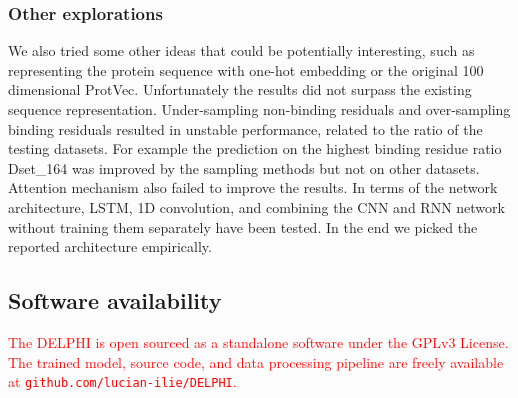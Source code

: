 \documentclass{bioinfo}
\newcommand{\mySecondColor}{red}
\begin{document}
\subsubsection{Other explorations}
We also tried some other ideas that could be potentially interesting, such as representing the protein sequence with one-hot embedding or the original 100 dimensional ProtVec. Unfortunately the results did not surpass the existing sequence representation. Under-sampling non-binding residuals and over-sampling binding residuals resulted in unstable performance, related to the ratio of the testing datasets. For example the prediction on the highest binding residue ratio Dset\_164 was improved by the sampling methods but not on other datasets. Attention mechanism also failed to improve the results. In terms of the network architecture, LSTM, 1D convolution, and combining the CNN and RNN network without training them separately have been tested. In the end we picked the reported architecture empirically. 

\subsection{Software availability}
\textcolor{\mySecondColor}{
The DELPHI is open sourced as a standalone software under the GPLv3 License. The trained model, source code, and data processing pipeline are freely available at \texttt{github.com/lucian-ilie/DELPHI}. }
\end{document}
